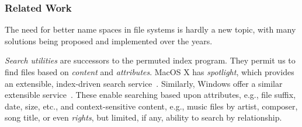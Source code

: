 \subsubsection{Related Work}\label{hotos19:background}
The need for better name spaces in file systems is hardly a new
topic, with many solutions being proposed and implemented over
the years.

\textit{Search utilities} are successors to the permuted index program.  They permit us to find
files based on \textit{content} and \textit{attributes}.  MacOS X has \textit{spotlight}, which
provides an extensible, index-driven search service~\cite{apple:spotlight-extensions}.  Similarly,
Windows offer a similar extensible service~\cite{microsoft:data-add-in}.  These enable searching
based upon attributes, e.g., file suffix, date, size, etc., and context-sensitive content, e.g.,
music files by artist, composer, song title, or even \textit{rights},
but limited, if any, ability to search by relationship.



